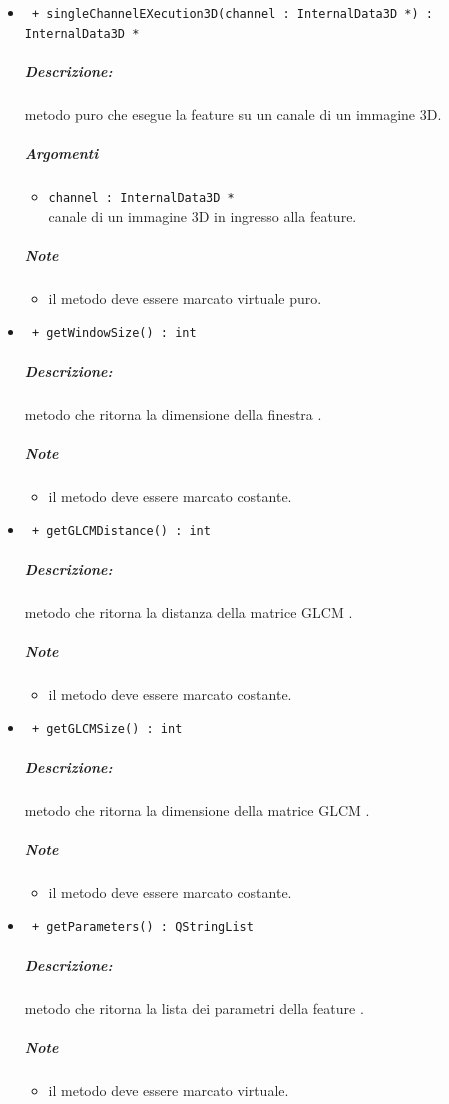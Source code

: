 \begin{itemize}
	\item \color{blue}\verb! + singleChannelEXecution3D(channel : InternalData3D *) : InternalData3D *!
		\color{black}
		\subparagraph{Descrizione:} metodo puro che esegue la feature su un canale di un immagine 3D.
		\subparagraph{Argomenti}
			\begin{itemize}
				\item \color{RoyalPurple} \verb!channel : InternalData3D * ! \\ 
				\color{black} canale di un immagine 3D in ingresso alla feature.		
			\end{itemize}
		\subparagraph{Note}
			\begin{itemize}
				\item il metodo deve essere marcato virtuale puro.
			\end{itemize}
			
	\item \color{blue}\verb! + getWindowSize() : int!
		\color{black}
		\subparagraph{Descrizione:} metodo che ritorna la dimensione della finestra .
		\subparagraph{Note}
			\begin{itemize}
				\item il metodo deve essere marcato costante.
			\end{itemize}
			
	\item \color{blue}\verb! + getGLCMDistance() : int!
		\color{black}
		\subparagraph{Descrizione:} metodo che ritorna la distanza della matrice GLCM	.
		\subparagraph{Note}
			\begin{itemize}
				\item il metodo deve essere marcato costante.
			\end{itemize}
			
	\item \color{blue}\verb! + getGLCMSize() : int!
		\color{black}
		\subparagraph{Descrizione:} metodo che ritorna la dimensione della matrice GLCM	.
		\subparagraph{Note}
			\begin{itemize}
				\item il metodo deve essere marcato costante.
			\end{itemize}
			
			
	\item \color{blue}\verb! + getParameters() : QStringList!
		\color{black}
		\subparagraph{Descrizione:} metodo che ritorna la lista dei parametri della feature\g{} .
		\subparagraph{Note}
			\begin{itemize}
				\item il metodo deve essere marcato virtuale.
			\end{itemize}
			

\end{itemize}
